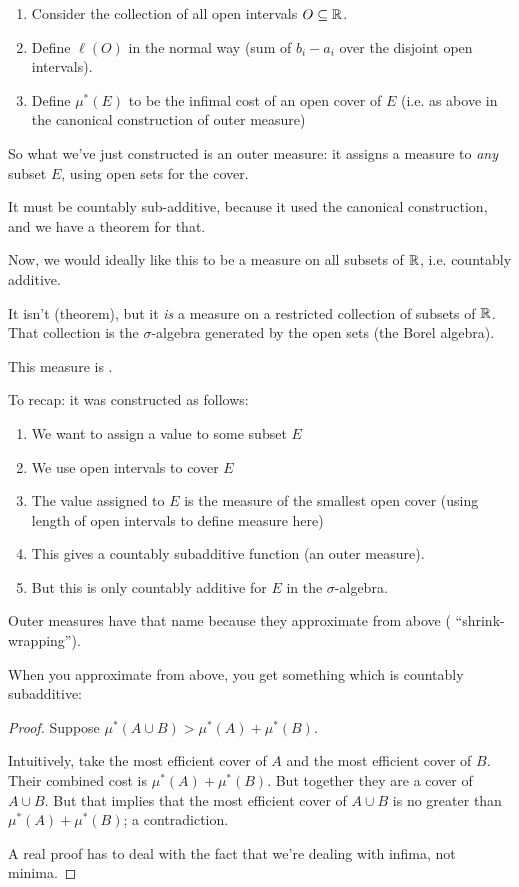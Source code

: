 \begin{example}
  \begin{enumerate}
  \item Consider the collection of all open intervals $O \subseteq \mathbb{R}$.
  \item Define $\ell(O)$ in the normal way (sum of $b_i - a_i$ over the disjoint open intervals).
  \item Define $\mu^*(E)$ to be the infimal cost of an open cover of $E$ (i.e. as above in the canonical
    construction of outer measure)
  \end{enumerate}
  So what we've just constructed is an outer measure: it assigns a measure to {\it any} subset $E$, using open sets
  for the cover.

  It must be countably sub-additive, because it used the canonical construction, and we have a theorem for that.

  Now, we would ideally like this to be a measure on all subsets of $\mathbb{R}$, i.e. countably additive.

  It isn't (theorem), but it {\it is} a measure on a restricted collection of subsets of $\mathbb{R}$. That collection is
  the $\sigma$-algebra generated by the open sets (the Borel algebra).

  This measure is .

  To recap: it was constructed as follows:
  \begin{enumerate}
  \item We want to assign a value to some subset $E$
  \item We use open intervals to cover $E$
  \item The value assigned to $E$ is the measure of the smallest open cover (using length of open intervals to
    define measure here)
  \item This gives a countably subadditive function (an outer measure).
  \item But this is only countably additive for $E$ in the $\sigma$-algebra.
  \end{enumerate}
\end{example}

\begin{intuition*}
  Outer measures have that name because they approximate from above ( ``shrink-wrapping​'').

  When you approximate from above, you get something which is countably subadditive:

  \begin{proof}
    Suppose $\mu^*(A \cup B) > \mu^*(A) + \mu^*(B)$.

    Intuitively, take the most efficient cover of $A$ and the most efficient cover of $B$. Their combined cost
    is $\mu^*(A) + \mu^*(B)$. But together they are a cover of $A \cup B$. But that implies that the most
    efficient cover of $A \cup B$ is no greater than $\mu^*(A) + \mu^*(B)$; a contradiction.

    A real proof has to deal with the fact that we're dealing with infima, not minima.
  \end{proof}
\end{intuition*}

